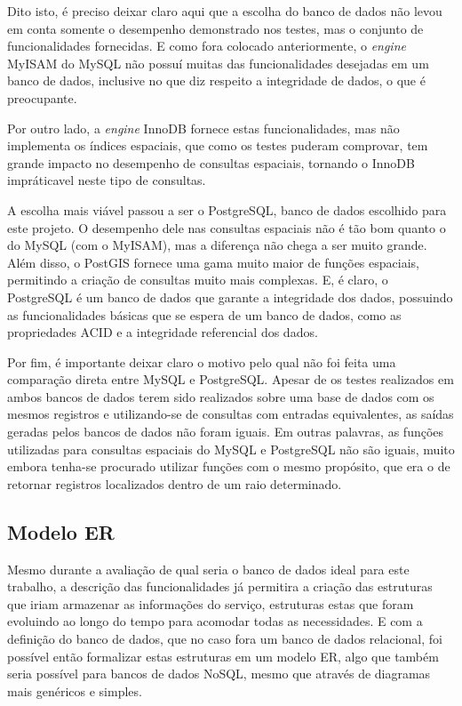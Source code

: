 \documentclass[diss]{template/setrem}
\begin{document}
Dito isto, é preciso deixar claro aqui que a escolha do banco de dados não levou em conta somente o desempenho demonstrado nos testes, mas o conjunto de funcionalidades fornecidas. E como fora colocado anteriormente, o \emph{engine} MyISAM do MySQL não possuí muitas das funcionalidades desejadas em um banco de dados, inclusive no que diz respeito a integridade de dados, o que é preocupante.

Por outro lado, a \emph{engine} InnoDB fornece estas funcionalidades, mas não implementa os índices espaciais, que como os testes puderam comprovar, tem grande impacto no desempenho de consultas espaciais, tornando o InnoDB impráticavel neste tipo de consultas.

A escolha mais viável passou a ser o PostgreSQL, banco de dados escolhido para este projeto. O desempenho dele nas consultas espaciais não é tão bom quanto o do MySQL (com o MyISAM), mas a diferença não chega a ser muito grande. Além disso, o PostGIS fornece uma gama muito maior de funções espaciais, permitindo a criação de consultas muito mais complexas. E, é claro, o PostgreSQL é um banco de dados que garante a integridade dos dados, possuindo as funcionalidades básicas que se espera de um banco de dados, como as propriedades ACID e a integridade referencial dos dados.

Por fim, é importante deixar claro o motivo pelo qual não foi feita uma comparação direta entre MySQL e PostgreSQL. Apesar de os testes realizados em ambos bancos de dados terem sido realizados sobre uma base de dados com os mesmos registros e utilizando-se de consultas com entradas equivalentes, as saídas geradas pelos bancos de dados não foram iguais. Em outras palavras, as funções utilizadas para consultas espaciais do MySQL e PostgreSQL não são iguais, muito embora tenha-se procurado utilizar funções com o mesmo propósito, que era o de retornar registros localizados dentro de um raio determinado.

\subsection{Modelo ER}
Mesmo durante a avaliação de qual seria o banco de dados ideal para este trabalho, a descrição das funcionalidades já permitira a criação das estruturas que iriam armazenar as informações do serviço, estruturas estas que foram evoluindo ao longo do tempo para acomodar todas as necessidades. E com a definição do banco de dados, que no caso fora um banco de dados relacional, foi possível então formalizar estas estruturas em um modelo ER, algo que também seria possível para bancos de dados NoSQL, mesmo que através de diagramas mais genéricos e simples.
\end{document}
